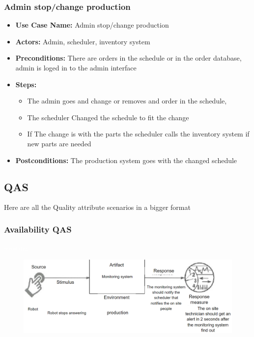 \subsubsection{Admin stop/change production}
\label{sec:admin-stop-change}

\begin{itemize}
\item \textbf{Use Case Name:} Admin stop/change production
\item \textbf{Actors:} Admin, scheduler, inventory system 
\item \textbf{Preconditions:} There are  orders in the schedule or in the order database, admin is loged in to the admin interface
\item \textbf{Steps:}
\begin{itemize}[label=--]
\item The admin goes and change or removes and order in the schedule, 
\item The scheduler Changed the schedule to fit the change
\item If The change is with the parts the scheduler calls the inventory system if new parts are needed
\end{itemize}
\item \textbf{Postconditions:} The production system goes with the changed schedule 
\end{itemize}

\newpage
\subsection{QAS}
\label{sec:QAS}

Here are all the Quality attribute scenarios in a bigger format
\vspace{1em}
\subsubsection{Availability QAS}
\label{sec:avaqas}
\textcolor{white}{somting}
\begin{figure}[H]
    \centering
    \includegraphics[width=0.8\linewidth]{Images/availability.png}
    \label{fig:availability}
\end{figure}

